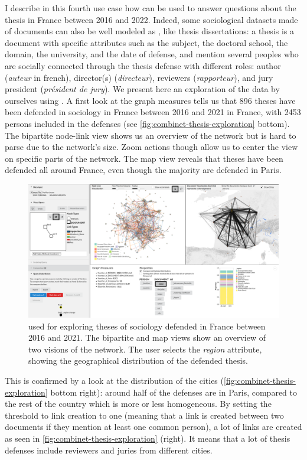I describe in this fourth use case how \name can be used to answer questions about the thesis in France between 2016 and 2022.
Indeed, some sociological datasets made of documents can also be well modeled as \modelplural, like thesis dissertations: a thesis is a document with specific attributes such as the subject, the doctoral school, the domain, the university, and the date of defense, and mention several peoples who are socially connected through the thesis defense with different roles: author (\textit{auteur} in french), director(s) (\textit{directeur}), reviewers (\textit{rapporteur}), and jury president (\textit{président de jury}).
We present here an exploration of the data by ourselves using \name.
A first look at the graph measures tells us that 896 theses have been defended in sociology in France between 2016 and 2021 in France, with 2453 persons included in the defenses (see \autoref{fig:combinet-thesis-exploration} bottom).
The bipartite node-link view shows us an overview of the network but is hard to parse due to the network's size.
Zoom actions though allow us to center the view on specific parts of the network.
The map view reveals that theses have been defended all around France, even though the majority are defended in Paris.
\begin{figure}[!ht]
    \centering
    \includegraphics[width=1\textwidth]{static/figures/ComBiNet/Thesis-first-exploration}
    \caption{\name used for exploring theses of sociology defended in France between 2016 and 2021. The bipartite and map views show an overview of two visions of the network. The user selects the \textit{region} attribute, showing the geographical distribution of the defended thesis.}\label{fig:combinet-thesis-exploration}
\end{figure}
This is confirmed by a look at the distribution of the cities (\autoref{fig:combinet-thesis-exploration} bottom right): around half of the defenses are in Paris, compared to the rest of the country which is more or less homogeneous.
By setting the threshold to link creation to one (meaning that a link is created between two documents if they mention at least one common person), a lot of links are created as seen in \autoref{fig:combinet-thesis-exploration} (right).
It means that a lot of thesis defenses include reviewers and juries from different cities.

